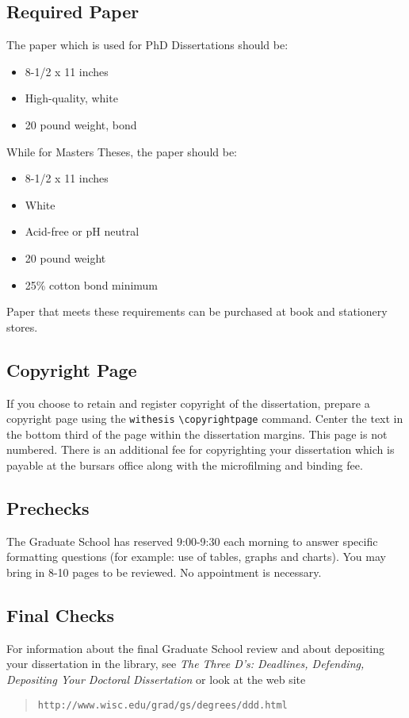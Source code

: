 \subsection{Required Paper}
The paper which is used for PhD Dissertations should be:
\begin{itemize}
\item 8-1/2 x 11 inches
\item High-quality, white
\item 20 pound weight, bond
\end{itemize}
 
While for Masters Theses, the paper should be:

\begin{itemize}
\item 8-1/2 x 11 inches
\item White
\item Acid-free or pH neutral
\item 20 pound weight
\item 25\% cotton bond minimum
\end{itemize}

Paper that meets these requirements can be purchased at book and stationery
stores.

\subsection{Copyright Page}
\label{copyright}
If you choose to retain and register copyright of the dissertation, prepare
a copyright page using the {\tt withesis} {\tt \verb|\copyrightpage|} command. 
Center the text in the bottom third of the page within the dissertation
margins. This page is not numbered. There is an additional fee for copyrighting
your dissertation which is payable at the bursars office along with the
microfilming and binding fee.

\subsection{Prechecks}
The Graduate School has reserved 9:00-9:30 each morning to answer specific formatting questions
(for example: use of tables, graphs and charts). You may bring in 8-10
pages to be reviewed. No appointment is necessary.

\subsection{Final Checks}
\sloppypar
For information about the final Graduate School review and about depositing
your dissertation in the library, see {\em The Three D's: Deadlines, Defending, 
Depositing Your Doctoral Dissertation} or look
at the web site 
\begin{quote}
{\tt http://www.wisc.edu/grad/gs/degrees/ddd.html}
\end{quote}

